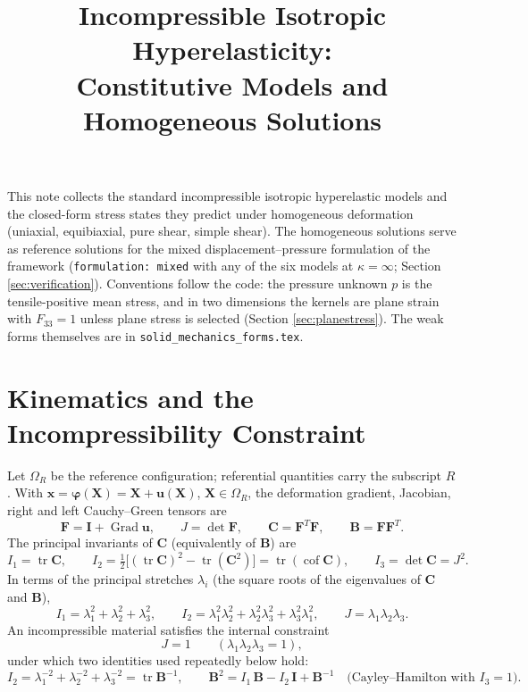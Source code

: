 \documentclass[11pt]{article}
\title{Incompressible Isotropic Hyperelasticity:\\
Constitutive Models and Homogeneous Solutions}
\author{}
\date{}
\newcommand{\Grad}{\operatorname{Grad}}
\newcommand{\tr}{\operatorname{tr}}
\newcommand{\cof}{\operatorname{cof}}
\newcommand{\bx}{\bm{x}}
\newcommand{\bX}{\bm{X}}
\newcommand{\bu}{\bm{u}}
\newcommand{\bF}{\bm{F}}
\newcommand{\bC}{\bm{C}}
\newcommand{\bB}{\bm{B}}
\newcommand{\bI}{\bm{I}}
\newcommand{\bphi}{\bm{\varphi}}
\newcommand{\Ione}{I_1}
\newcommand{\Itwo}{I_2}
\newcommand{\code}[1]{{\frenchspacing\texttt{#1}}}
\begin{document}
\maketitle

\noindent
This note collects the standard incompressible isotropic hyperelastic
models and the closed-form stress states they predict under homogeneous
deformation (uniaxial, equibiaxial, pure shear, simple shear).  The
homogeneous solutions serve as reference solutions for the mixed
displacement--pressure formulation of the framework
(\code{formulation: mixed} with any of the six models at $\kappa = \infty$;
Section \ref{sec:verification}).  Conventions follow the code:
the pressure unknown $p$ is the tensile-positive mean stress, and in two
dimensions the kernels are plane strain with $F_{33} = 1$ unless plane
stress is selected (Section \ref{sec:planestress}).  The weak forms
themselves are in \code{solid\_mechanics\_forms.tex}.

\section{Kinematics and the Incompressibility Constraint}

Let $\Omega_R$ be the reference configuration; referential quantities
carry the subscript $R$.  With $\bx = \bphi(\bX) = \bX + \bu(\bX)$,
$\bX \in \Omega_R$, the deformation gradient, Jacobian, right and left
Cauchy--Green tensors are
\begin{equation}
  \bF = \bI + \Grad\bu, \qquad J = \det\bF, \qquad
  \bC = \bF^T\bF, \qquad \bB = \bF\bF^T .
\end{equation}
The principal invariants of $\bC$ (equivalently of $\bB$) are
\begin{equation}
  \Ione = \tr\bC, \qquad
  \Itwo = \tfrac12\bigl[(\tr\bC)^2 - \tr(\bC^2)\bigr] = \tr(\cof\bC), \qquad
  I_3 = \det\bC = J^2 .
\end{equation}
In terms of the principal stretches $\lambda_i$ (the square roots of the
eigenvalues of $\bC$ and $\bB$),
\begin{equation}
  \Ione = \lambda_1^2 + \lambda_2^2 + \lambda_3^2, \qquad
  \Itwo = \lambda_1^2\lambda_2^2 + \lambda_2^2\lambda_3^2 + \lambda_3^2\lambda_1^2, \qquad
  J = \lambda_1\lambda_2\lambda_3 .
\end{equation}
An incompressible material satisfies the internal constraint
\begin{equation}
  J = 1 \qquad (\lambda_1\lambda_2\lambda_3 = 1),
  \label{eq:constraint}
\end{equation}
under which two identities used repeatedly below hold:
\begin{equation}
  \Itwo = \lambda_1^{-2} + \lambda_2^{-2} + \lambda_3^{-2} = \tr\bB^{-1},
  \qquad
  \bB^2 = \Ione\,\bB - \Itwo\,\bI + \bB^{-1}
  \quad\text{(Cayley--Hamilton with } I_3 = 1\text{)}.
  \label{eq:ch}
\end{equation}
\end{document}

